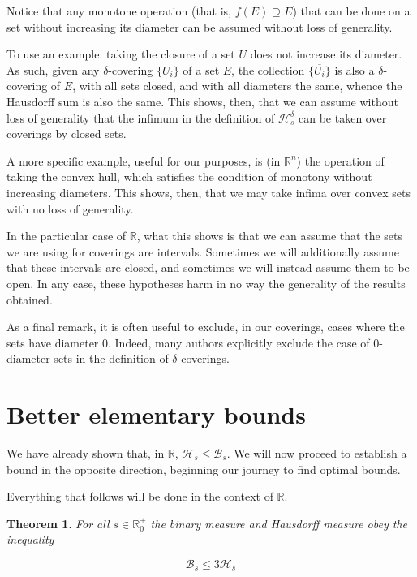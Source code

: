 \documentclass[11pt, reqno]{amsart}
\newcommand{\R}{\mathbb{R}}
\newcommand{\HH}{\mathcal{H}}
\newcommand{\BB}{\mathcal{B}}
\newtheorem{theorem}{Theorem}
\begin{document}
Notice that any monotone operation (that is, $f(E) \supseteq E$) that can be done on a set without increasing its diameter can be assumed without loss of generality.

To use an example: taking the closure of a set $U$ does not increase its diameter. As such, given any $\delta$-covering $\{U_i\}$ of a set $E$, the collection $\{ \overline{U_i} \}$ is also a $\delta$-covering of $E$, with all sets closed, and with all diameters the same, whence the Hausdorff sum is also the same. This shows, then, that we can assume without loss of generality that the infimum in the definition of $\HH_s^\delta$ can be taken over coverings by closed sets.

A more specific example, useful for our purposes, is (in $\R^n$) the operation of taking the convex hull, which satisfies the condition of monotony without increasing diameters. This shows, then, that we may take infima over convex sets with no loss of generality.

In the particular case of $\R$, what this shows is that we can assume that the sets we are using for coverings are intervals. Sometimes we will additionally assume that these intervals are closed, and sometimes we will instead assume them to be open. In any case, these hypotheses harm in no way the generality of the results obtained.

As a final remark, it is often useful to exclude, in our coverings, cases where the sets have diameter 0. Indeed, many authors explicitly exclude the case of 0-diameter sets in the definition of $\delta$-coverings.

\section{Better elementary bounds}

We have already shown that, in $\R$, $\HH_s \leq \BB_s$. We will now proceed to establish a bound in the opposite direction, beginning our journey to find optimal bounds.

Everything that follows will be done in the context of $\R$.

\begin{theorem} For all $s \in \R^+_0$ the binary measure and Hausdorff measure obey the inequality

\begin{equation}\label{easybound}
\BB_s \leq 3 \HH_s
\end{equation}
\end{theorem}
\end{document}
